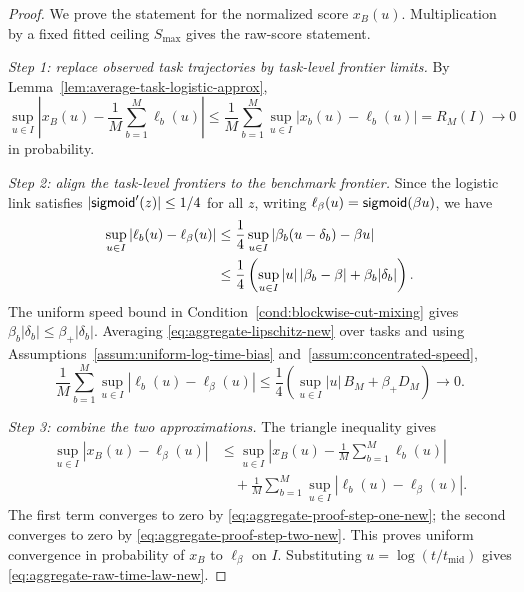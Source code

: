 \begin{proof}
We prove the statement for the normalized score \(x_B(u)\). Multiplication by a fixed fitted ceiling $S_{\max}$ gives the raw-score statement.

\emph{Step 1: replace observed task trajectories by task-level frontier limits.} By Lemma~\ref{lem:average-task-logistic-approx},
\begin{equation}
    \sup_{u\in I}\left|x_B(u)-\frac1M\sum_{b=1}^{M}\ell_b(u)\right|
    \le
    \frac1M\sum_{b=1}^{M}\sup_{u\in I}|x_b(u)-\ell_b(u)|
    =R_M(I)\to0
    \label{eq:aggregate-proof-step-one-new}
\end{equation}
in probability.

\emph{Step 2: align the task-level frontiers to the benchmark frontier.} Since the logistic link satisfies $|\mathsf{sigmoid}'(z)|\le1/4$ for all $z$, writing \(\ell_\beta(u) = \mathsf{sigmoid}(\beta u)\), we have
\begin{align}
    \sup_{u\in I}|\ell_b(u)-\ell_\beta(u)|
    &\le
    \frac14\sup_{u\in I}
    \left|\beta_b(u-\delta_b)-\beta u\right| \notag\\
    &\le
    \frac14\left(\sup_{u\in I}|u|\,|\beta_b-\beta|+\beta_b|\delta_b|\right).
    \label{eq:aggregate-lipschitz-new}
\end{align}
The uniform speed bound in Condition~\ref{cond:blockwise-cut-mixing} gives $\beta_b|\delta_b|\le \beta_+|\delta_b|$. Averaging \eqref{eq:aggregate-lipschitz-new} over tasks and using Assumptions~\ref{assum:uniform-log-time-bias} and~\ref{assum:concentrated-speed},
\begin{equation}
    \frac1M\sum_{b=1}^{M}\sup_{u\in I}|\ell_b(u)-\ell_\beta(u)|
    \le
    \frac14\left(\sup_{u\in I}|u|\,B_M+\beta_+D_M\right)
    \to0.
    \label{eq:aggregate-proof-step-two-new}
\end{equation}

\emph{Step 3: combine the two approximations.} The triangle inequality gives
\begin{align*}
    \sup_{u\in I}|x_B(u)-\ell_\beta(u)|
    &\le
    \sup_{u\in I}\left|x_B(u)-\frac1M\sum_{b=1}^{M}\ell_b(u)\right| \\
    &\quad +
    \frac1M\sum_{b=1}^{M}\sup_{u\in I}|\ell_b(u)-\ell_\beta(u)|.
\end{align*}
The first term converges to zero by \eqref{eq:aggregate-proof-step-one-new}; the second converges to zero by \eqref{eq:aggregate-proof-step-two-new}. This proves uniform convergence in probability of $x_B$ to $\ell_\beta$ on $I$. Substituting $u=\log(t/t_{\mathrm{mid}})$ gives \eqref{eq:aggregate-raw-time-law-new}.
\end{proof}

